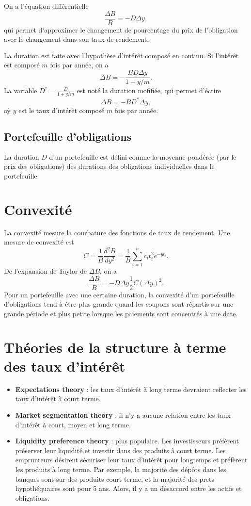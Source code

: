 On a l'équation différentielle 
$$\frac{\Delta B}{B} = -D\Delta y,$$
qui permet d'approximer le changement de pourcentage du prix de l'obligation avec le changement dans son taux de rendement. 

La duration est faite avec l'hypothèse d'intérêt composé en continu. Si l'intérêt est composé $m$ fois par année, on a 
$$\Delta B = - \frac{BD \Delta y}{1 + y/m}.$$
La variable $D^* = \frac{D}{1 + y/m}$ est noté la duration mofifiée, qui permet d'écrire
$$\Delta B = -BD^* \Delta y,$$
oỳ $y$ est le taux d'intérêt composé $m$ fois par année. 

\subsection{Portefeuille d'obligations}

La duration $D$ d'un portefeuille est défini comme la moyenne pondérée (par le prix des obligations) des durations des obligations individuelles dans le portefeuille. 

\section{Convexité}

La convexité mesure la courbature des fonctions de taux de rendement. Une mesure de convexité est
$$C = \frac{1}{B} \frac{d^2 B}{dy^2} = \frac{1}{B} \sum_{i = 1}^{n} c_i t_i^2 e^{-yt_i}.$$
De l'expansion de Taylor de $\Delta B$, on a 
$$\frac{\Delta B}{B} = -D\Delta y  \frac{1}{2} C (\Delta y)^2.$$
Pour un portefeuille avec une certaine duration, la convexité d'un portefeuille d'obligations tend à être plus grande quand les coupons sont répartis sur une grande période et plus petite lorsque les paiements sont concentrés à une date. 

\section{Théories de la structure à terme des taux d'intérêt}

\begin{itemize}
	\item \textbf{Expectations theory} : les taux d'intérêt à long terme devraient reflecter les taux d'intérêt à court terme. 
	\item \textbf{Market segmentation theory} : il n'y a aucune relation entre les taux d'intérêt à court, moyen et long terme. 
	\item \textbf{Liquidity preference theory} : plus populaire. Les investisseurs préfèrent préserver leur liquidité et investir dans des produits à court terme. Les emprunteurs désirent sécuriser leur taux d'intérêt pour longtemps et préfèrent les produits à long terme. Par exemple, la majorité des dépôts dans les banques sont sur des produits court terme, et la majorité des prets hypothéquaires sont pour 5 ans. Alors, il y a un désaccord entre les actifs et obligations. 
\end{itemize}

